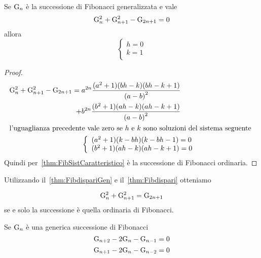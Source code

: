 \begin{thm}[Dispari]\label{thm:FibdispariGen}
	Se $\mathrm{G}_{n}$ è la successione di Fibonacci generalizzata e vale 
	\begin{equation}
		\mathrm{G}_{n}^2+\mathrm{G}_{n+1}^2-\mathrm{G}_{2n+1}=0 
	\end{equation}\label{eqn:FibDispariGen} allora 
\[\begin{cases}
	h=0\\
	k=1\\
\end{cases}\]
\end{thm}
\begin{proof}
\begin{align*}
\mathrm{G}_{n}^2+\mathrm{G}_{n+1}^2-\mathrm{G}_{2n+1}={}&a^{2n}\dfrac{(a^2+1)(bh-k)(bh-k+1)}{\left(a-b\right)^2}\\
+&b^{2n}\dfrac{(b^2+1)(ah-k)(ah-k+1)}{\left(a-b\right)^2}\\
\intertext{l'uguaglianza precedente vale zero se $h$ e $k$ sono soluzioni del sistema seguente }
&	\left\{
\begin{array}{l}
	(a^2+1)(k-bh)(k-bh-1)=0\\
	(b^2+1)(ah-k)(ah-k+1)=0
\end{array}
\right.\\
\end{align*}
Quindi per~\vref{thm:FibSistCaratteristico} è la successione di Fibonacci ordinaria.
\end{proof}
Utilizzando il~\vref{thm:FibdispariGen} e il~\vref{thm:Fibdispari} otteniamo
\begin{thm}[Unicità]
	\begin{equation}
		\mathrm{G}_{n}^2+\mathrm{G}_{n+1}^2=\mathrm{G}_{2n+1} 
	\end{equation} se e solo la successione è quella ordinaria di Fibonacci. 
\end{thm}
\begin{thm}[Proprietà]
	Se $\mathrm{G}_{n}$ è una generica successione di Fibonacci
	\begin{equation}
		\mathrm{G}_{n+2}-2\mathrm{G}_{n}-\mathrm{G}_{n-1}=0 
	\end{equation} 
\begin{equation}
	\mathrm{G}_{n+1}-2\mathrm{G}_{n}-\mathrm{G}_{n-2}=0 
\end{equation} 
\end{thm}~\cite{Horadam_1961}
